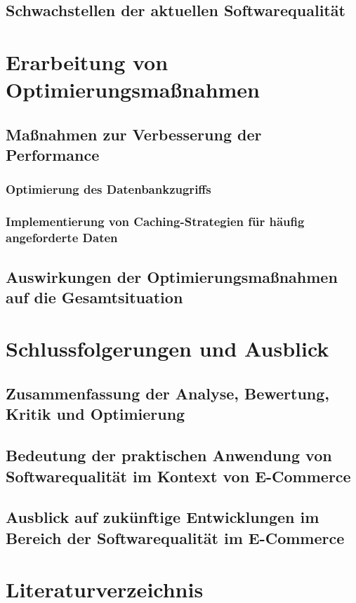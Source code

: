 \documentclass{article}
\begin{document}
\subsection{Schwachstellen der aktuellen Softwarequalität}

\section{Erarbeitung von Optimierungsmaßnahmen}
\subsection{Maßnahmen zur Verbesserung der Performance}
\subsubsection{Optimierung des Datenbankzugriffs}
\subsubsection{Implementierung von Caching-Strategien für häufig angeforderte Daten}
\subsection{Auswirkungen der Optimierungsmaßnahmen auf die Gesamtsituation}

\section{Schlussfolgerungen und Ausblick}
\subsection{Zusammenfassung der Analyse, Bewertung, Kritik und Optimierung}
\subsection{Bedeutung der praktischen Anwendung von Softwarequalität im Kontext von E-Commerce}
\subsection{Ausblick auf zukünftige Entwicklungen im Bereich der Softwarequalität im E-Commerce}

\section{Literaturverzeichnis}
\printbibliography[title={quellen.tex}]
\end{document}
